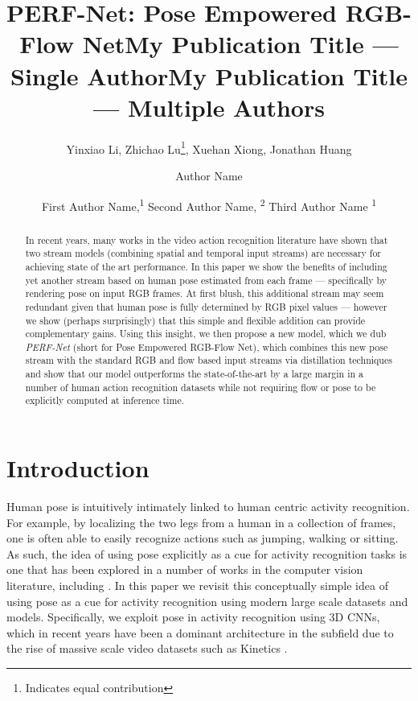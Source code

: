 \documentclass[letterpaper]{article} \usepackage{aaai21}  \usepackage{times}  \usepackage{helvet} \usepackage{courier}  \usepackage[hyphens]{url}  \usepackage{graphicx} \urlstyle{rm} \def\UrlFont{\rm}  \usepackage{natbib}  \usepackage{caption} \frenchspacing  \setlength{\pdfpagewidth}{8.5in}  \setlength{\pdfpageheight}{11in}
\title{PERF-Net: Pose Empowered RGB-Flow Net}
\author{
Yinxiao Li, Zhichao Lu\thanks{Indicates equal contribution}, Xuehan Xiong, Jonathan Huang \\
}
\title{My Publication Title --- Single Author}
\author {
Author Name \\
}
\title{My Publication Title --- Multiple Authors}
\author {


        First Author Name,\textsuperscript{\rm 1}
        Second Author Name, \textsuperscript{\rm 2}
        Third Author Name \textsuperscript{\rm 1} \\
}
\begin{document}
\maketitle

\begin{abstract}





In recent years, many works in the video action recognition literature have shown that two stream models (combining spatial and temporal input streams) are necessary for achieving state of the art performance. In this paper we show the benefits of including yet another stream based on human pose estimated from each frame --- specifically by rendering pose on input RGB frames. At first blush, this additional stream may seem redundant given that human pose is fully determined by RGB pixel values --- however we show (perhaps surprisingly) that this simple and flexible addition can provide complementary gains. Using this insight, we then propose a new model, which we dub \emph{PERF-Net} (short for Pose Empowered RGB-Flow Net), which combines this new pose stream with the standard RGB and flow based input streams via distillation techniques and show that our model outperforms the state-of-the-art by a large margin in a number of human action recognition datasets while not requiring flow or pose to be explicitly computed at inference time.
\end{abstract}


\section{Introduction}\label{sec:intro}

Human pose  is intuitively intimately linked to human centric activity recognition.  For  example,  by  localizing the two  legs from  a  human  in  a  collection  of  frames, one is often able to easily recognize actions such  as  jumping,  walking  or  sitting.  As such, the idea of using pose explicitly as a cue for activity recognition tasks is one that has been explored in a number of works in the computer vision literature, including \cite{potion2018,crasto2019mars,LGD_3D,cheron2015p,angelayao_bmvc_2011_pose}. In this paper we revisit this conceptually simple idea of using pose as a cue for activity recognition using modern large scale datasets and models.  Specifically, we exploit pose in activity recognition using 3D CNNs, which in recent years have been a dominant architecture in the subfield due to the rise of massive scale video datasets such as Kinetics \cite{kay2017kinetics,carreira2017quo}.
\end{document}
